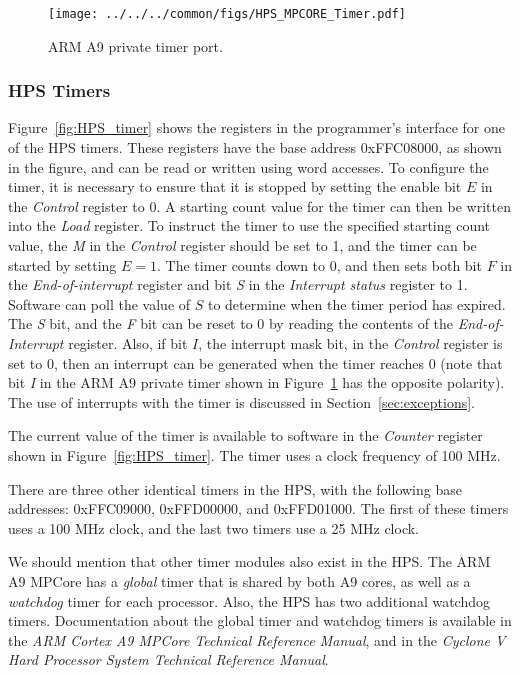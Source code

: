 \begin{figure}[h!]
   \begin{center}
       \texttt{[image: ../../../common/figs/HPS\_MPCORE\_Timer.pdf]}
   \end{center}
   \caption{ARM A9 private timer port.}
	\label{fig:MPCORE_timer}
\end{figure}

\subsubsection{HPS Timers}
\label{sec:HPS_timers}
Figure~\ref{fig:HPS_timer} shows the registers in the programmer's interface for one of 
the HPS timers.  These registers have the base address {\sf 0xFFC08000}, as shown in
the figure, and can be read or written using word accesses. To configure the timer, 
it is necessary to ensure that it is stopped by setting the enable bit $E$ 
in the {\it Control} register to 0. A starting count value for the timer can then be written into
the {\it Load} register. To instruct the timer to use the specified starting count value, the
{\it M} in the {\it Control} register should be set to 1, and the timer can be started by 
setting $E = 1$. The timer counts down to 0, and then sets both bit $F$ in the 
{\it End-of-interrupt} register and bit {\it S} in the {\it Interrupt status} register to 1. 
Software can poll the value of $S$ to determine when the timer period has expired. 
The {\it S} bit, and the {\it F} bit can be reset to 0 by reading the contents of 
the {\it End-of-Interrupt} register.  Also, if bit $I$, the interrupt mask bit, in 
the {\it Control} register is set to 0, then an interrupt can be generated when 
the timer reaches 0 (note that bit {\it I} in the ARM A9 private timer shown in 
Figure~\ref{fig:MPCORE_timer} has the opposite polarity). The use of interrupts with the
timer is discussed in Section~\ref{sec:exceptions}.

The current value of the timer is available to software in the {\it Counter} register shown in 
Figure~\ref{fig:HPS_timer}.  The timer uses a clock frequency of 100 MHz. 

There are three other identical timers in the HPS, with the following base
addresses: {\sf 0xFFC09000}, {\sf 0xFFD00000}, and {\sf 0xFFD01000}. The first of these
timers uses a 100 MHz clock, and the last two timers use a 25 MHz clock.

We should mention that other timer modules also exist in the HPS. The ARM A9 MPCore has
a {\it global} timer that is shared by both A9 cores, as well as a {\it watchdog} timer
for each processor. Also, the HPS has two additional watchdog timers. Documentation about
the global timer and watchdog timers is available in the {\it ARM Cortex A9 MPCore
Technical Reference Manual}, and in the {\it Cyclone V Hard Processor System
Technical Reference Manual}.

